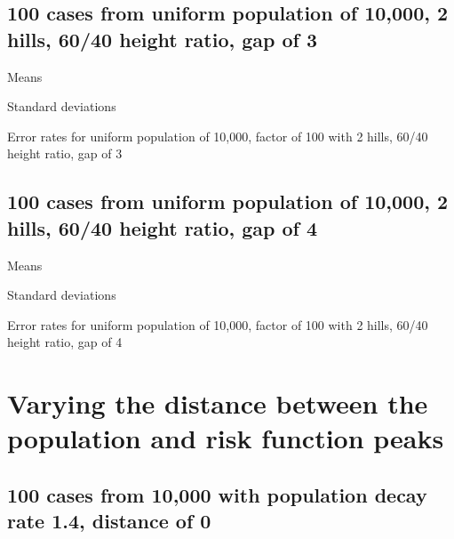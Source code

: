 \subsection{100 cases from uniform population of 10,000, 2 hills, 60/40 height ratio, gap of 3}
\begin{table}[H]
\centering
\scriptsize

    \begin{subtable}{0.5\textwidth}
    
    \caption{Means} 
    \end{subtable}%
    \begin{subtable}{0.5\textwidth}
    
    \caption{Standard deviations} 
    \end{subtable}

\caption{Error rates for uniform population of 10,000, factor of 100 with 2 hills, 60/40 height ratio, gap of 3}
\label{tbl:mean_error_rates:unif_100_1_2h_3}
\end{table}
\subsection{100 cases from uniform population of 10,000, 2 hills, 60/40 height ratio, gap of 4}
\begin{table}[H]
\centering
\scriptsize

    \begin{subtable}{0.5\textwidth}
    
    \caption{Means} 
    \end{subtable}%
    \begin{subtable}{0.5\textwidth}
    
    \caption{Standard deviations} 
    \end{subtable}

\caption{Error rates for uniform population of 10,000, factor of 100 with 2 hills, 60/40 height ratio, gap of 4}
\label{tbl:mean_error_rates:unif_100_1_2h_4}
\end{table}

\section{Varying the distance between the population and risk function peaks}

\subsection{100 cases from 10,000 with population decay rate 1.4, distance of 0}

